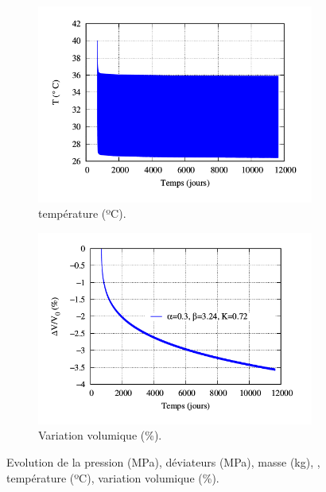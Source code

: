 \documentclass[11pt,french,a4paper]{article}
\begin{document}
\begin{figure}[h!]
    \begin{subfigure}[b]{0.42\linewidth}
        \includegraphics[width=\linewidth]{image/annexe/cav_sal/P2M_bon/T.png}
        \caption{température (ºC).}
    \end{subfigure}
    \begin{subfigure}[b]{0.42\linewidth}
        \includegraphics[width=\linewidth]{image/annexe/cav_sal/P2M_bon/Delta_vol_(1).png}
        \caption{Variation volumique (\%).}
    \end{subfigure}
    \caption{Evolution de la pression (MPa), déviateurs (MPa), masse (kg), , température (ºC), variation volumique (\%). }
    
    \end{figure}
    
\end{document}
